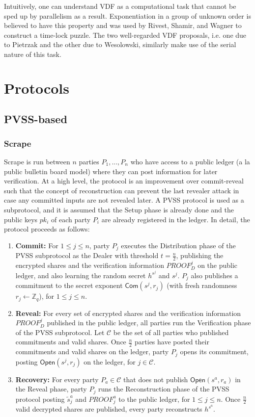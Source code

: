 \documentclass[letterpaper,twocolumn,10pt]{article}
\theoremstyle{definition}
\theoremstyle{remark}
\begin{document}
Intuitively, one can understand VDF as a computational task that cannot be sped up by parallelism as a result. Exponentiation in a group of unknown order is believed to have this property and was used by Rivest, Shamir, and Wagner to construct a time-lock puzzle. The two well-regarded VDF proposals, i.e. one due to Pietrzak and the other due to Wesolowski, similarly make use of the serial nature of this task.

\section{Protocols}
\subsection{PVSS-based}
\subsubsection{Scrape}
Scrape is run between $n$ parties $P_1, ..., P_n$ who have access to a public ledger (a la public bulletin board model) where they can post information for later verification. At a high level, the protocol is an improvement over commit-reveal such that the concept of reconstruction can prevent the last revealer attack in case any committed inputs are not revealed later. A PVSS protocol is used as a subprotocol, and it is assumed that the Setup phase is already done and the public keys $pk_i$ of each party $P_i$ are already registered in the ledger. In detail, the protocol proceeds as follows:

\begin{enumerate}
\item \textbf{Commit:} For $1 \leq j \leq n$, party $P_j$ executes the Distribution phase of the PVSS subprotocol as the Dealer with threshold $t = \frac{n}{2}$, publishing the encrypted shares and the verification information $PROOF_D^j$ on the public ledger, and also learning the random secret $h^{s^j}$ and $s^j$. $P_j$ also publishes a commitment to the secret exponent $\mathsf{Com}(s^j, r_j)$ (with fresh randomness $r_j \leftarrow \mathbb{Z}_q$), for $1 \leq j \leq n$.
\item \textbf{Reveal:} For every set of encrypted shares and the verification information $PROOF_D^j$ published in the public ledger, all parties run the Verification phase of the PVSS subprotocol. Let $\mathcal{C}$ be the set of all parties who published commitments and valid shares. Once $\frac{n}{2}$ parties have posted their commitments and valid shares on the ledger, party $P_j$ opens its commitment, posting $\mathsf{Open}(s^j, r_j)$ on the ledger, for $j \in \mathcal{C}$.
\item \textbf{Recovery:} For every party $P_a \in \mathcal{C}$ that does not publish $\mathsf{Open}(s^a, r_a)$ in the Reveal phase, party $P_j$ runs the Reconstruction phase of the PVSS protocol posting $\tilde{s}_j^a$ and $PROOF_j^a$ to the public ledger, for $1 \leq j \leq n$. Once $\frac{n}{2}$ valid decrypted shares are published, every party reconstructs $h^{s^a}$.
\end{enumerate}
\end{document}
